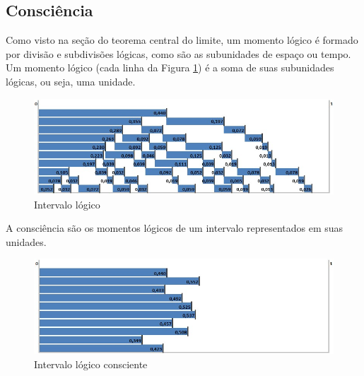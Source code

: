 \subsection{Consciência}
Como visto na seção do teorema central do limite, um momento lógico é formado por divisão e subdivisões lógicas, como são as subunidades de espaço ou tempo. Um momento lógico (cada linha da Figura \ref{fig:consciousness_logical_moments}) é a soma de suas subunidades lógicas, ou seja, uma unidade.

\begin{figure}[H]
\caption{Intervalo lógico}
\label{fig:consciousness_logical_moments}
\centering
\includegraphics[scale=.7]{sections/images/consciousness_logical_moments.jpg}
\end{figure}

A consciência são os momentos lógicos de um intervalo representados em suas unidades.

\begin{figure}[H]
\caption{Intervalo lógico consciente}
\label{fig:consciousness}
\centering
\includegraphics[scale=.7]{sections/images/consciousness.jpg}
\end{figure}

%


